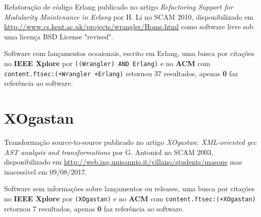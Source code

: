 Refatoração de código Erlang
publicado no artigo {\it Refactoring Support for Modularity Maintenance in Erlang}
por H. Li
no SCAM 2010,
disponibilizado em \url{http://www.cs.kent.ac.uk/projects/wrangler/Home.html}
como software livre
sob uma licença BSD License "revised".

Software com lançamentos ocsaionais,
escrito em Erlang,
uma busca por citações no {\bf IEEE Xplore} por
\texttt{((Wrangler) AND Erlang)}
e no {\bf ACM} com
\texttt{content.ftsec:(+Wrangler +Erlang)}
retornou
37 resultados, apenas
{\bf 0} faz referência ao software.



\section{XOgastan}

Transformação source-to-source
publicado no artigo {\it XOgastan: XML-oriented gcc AST analysis and transformations}
por G. Antoniol
no SCAM 2003,
disponibilizado em \url{http://web.ing.unisannio.it/villano/students/masone}
mas inacessível em 09/08/2017.

Software sem informações sobre lançamentos ou releases,
uma busca por citações no {\bf IEEE Xplore} por
\texttt{(XOgastan)}
e no {\bf ACM} com
\texttt{content.ftsec:(+XOgastan)}
retornou
7 resultados, apenas
{\bf 0} faz referência ao software.




